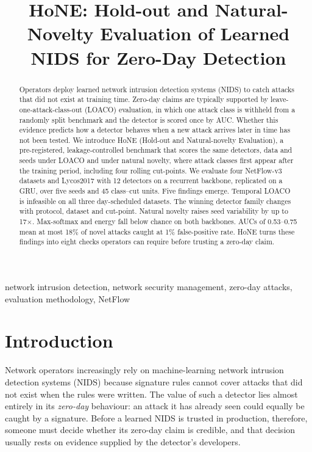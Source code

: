 \documentclass[conference]{IEEEtran}
\newif\ifanonymous
\begin{document}
\title{HoNE: Hold-out and Natural-Novelty Evaluation of Learned NIDS for Zero-Day Detection}

\ifanonymous
\author{\IEEEauthorblockN{Anonymous Author(s)}\IEEEauthorblockA{Submission under double-blind review}}
\else
\author{
}
\fi
\maketitle

\begin{abstract}
Operators deploy learned network intrusion detection systems (NIDS) to catch attacks that did not exist at training time. Zero-day claims are typically supported by leave-one-attack-class-out (LOACO) evaluation, in which one attack class is withheld from a randomly split benchmark and the detector is scored once by AUC. Whether this evidence predicts how a detector behaves when a new attack arrives later in time has not been tested. We introduce HoNE (Hold-out and Natural-novelty Evaluation), a pre-registered, leakage-controlled benchmark that scores the same detectors, data and seeds under LOACO and under natural novelty, where attack classes first appear after the training period, including four rolling cut-points. We evaluate four NetFlow-v3 datasets and Lycos2017 with 12 detectors on a recurrent backbone, replicated on a GRU, over five seeds and 45 class--cut units. Five findings emerge. Temporal LOACO is infeasible on all three day-scheduled datasets. The winning detector family changes with protocol, dataset and cut-point. Natural novelty raises seed variability by up to 17$\times$. Max-softmax and energy fall below chance on both backbones. AUCs of 0.53--0.75 mean at most 18\% of novel attacks caught at 1\% false-positive rate. HoNE turns these findings into eight checks operators can require before trusting a zero-day claim.
\end{abstract}

\begin{IEEEkeywords}
network intrusion detection, network security management, zero-day attacks, evaluation methodology, NetFlow
\end{IEEEkeywords}

\section{Introduction}
\label{sec:intro}
Network operators increasingly rely on machine-learning network intrusion detection systems (NIDS) because signature rules cannot cover attacks that did not exist when the rules were written. The value of such a detector lies almost entirely in its \emph{zero-day} behaviour: an attack it has already seen could equally be caught by a signature. Before a learned NIDS is trusted in production, therefore, someone must decide whether its zero-day claim is credible, and that decision usually rests on evidence supplied by the detector's developers.
\end{document}
